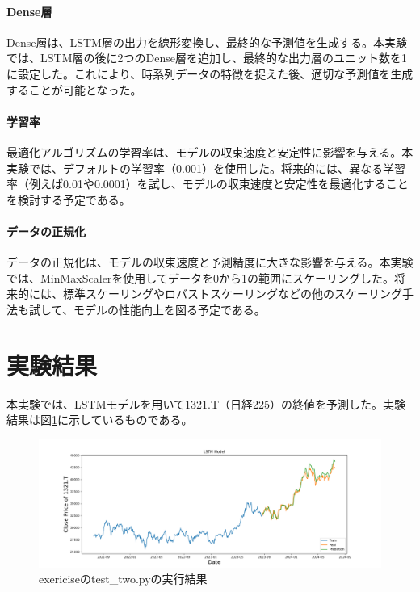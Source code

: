 \documentclass[a4paper, 11pt, titlepage]{jsarticle}
\begin{document}
\paragraph{Dense層}
\indent Dense層は、LSTM層の出力を線形変換し、最終的な予測値を生成する。本実験では、LSTM層の後に2つのDense層を追加し、最終的な出力層のユニット数を1に設定した。これにより、時系列データの特徴を捉えた後、適切な予測値を生成することが可能となった。

\paragraph{学習率}
\indent 最適化アルゴリズムの学習率は、モデルの収束速度と安定性に影響を与える。本実験では、デフォルトの学習率（0.001）を使用した。将来的には、異なる学習率（例えば0.01や0.0001）を試し、モデルの収束速度と安定性を最適化することを検討する予定である。

\paragraph{データの正規化}
\indent データの正規化は、モデルの収束速度と予測精度に大きな影響を与える。本実験では、MinMaxScalerを使用してデータを0から1の範囲にスケーリングした。将来的には、標準スケーリングやロバストスケーリングなどの他のスケーリング手法も試して、モデルの性能向上を図る予定である。

\section{実験結果}
\indent 本実験では、LSTMモデルを用いて1321.T（日経225）の終値を予測した。実験結果は図\ref{twopython}に示しているものである。
\begin{figure}[htbp]
  \centering
  \includegraphics[width=120mm]{./exericise/image/lstm_model.png}
  \caption{exericiseのtest\_two.pyの実行結果}
  \label{twopython}
\end{figure}
\end{document}
